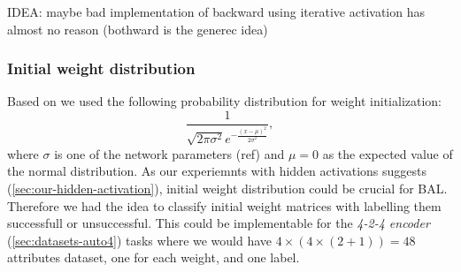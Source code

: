 IDEA: maybe bad implementation of backward
      using iterative activation has almost no reason (bothward is the generec idea) 

\subsubsection*{Initial weight distribution} 
\label{sec:results-sigma} %
\label{sec:our-sigma} 

Based on \citet{o1996bio} we used the following probability distribution for weight initialization: 
\begin{equation} 
\frac{1}{\sqrt{2\pi \sigma^2} e^{-\frac{(x-\mu)^2}{2\sigma^2}}} \nonumber,
\end{equation} 
where $\sigma$ is one of the network parameters (ref) and $\mu = 0$ as the expected value of the normal distribution. As our experiemnts with hidden activations suggests (\ref{sec:our-hidden-activation}), initial weight distribution could be crucial for BAL. Therefore we had the idea to classify initial weight matrices with labelling them successfull or unsuccessful. This could be implementable for the \emph{4-2-4 encoder} (\ref{sec:datasets-auto4}) tasks where we would have $4\times(4\times(2+1))=48$ attributes dataset, one for each weight, and one label.

